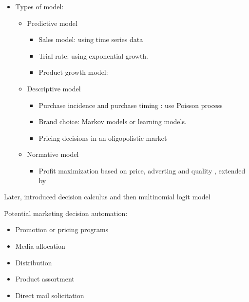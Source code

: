 \documentclass[
]{book}
\providecommand{\tightlist}{%
  \setlength{\itemsep}{0pt}\setlength{\parskip}{0pt}}
\begin{document}
\citep{leeflang2000}

\begin{itemize}
\item
  Types of model:

  \begin{itemize}
  \item
    Predictive model

    \begin{itemize}
    \item
      Sales model: using time series data
    \item
      Trial rate: using exponential growth.
    \item
      Product growth model: \citet{Bass_1969}
    \end{itemize}
  \item
    Descriptive model

    \begin{itemize}
    \item
      Purchase incidence and purchase timing : use Poisson process
    \item
      Brand choice: Markov models or learning models.
    \item
      Pricing decisions in an oligopolistic market \citet{howard1968}
    \end{itemize}
  \item
    Normative model

    \begin{itemize}
    \tightlist
    \item
      Profit maximization based on price, adverting and quality \citep{dorfman1976}, extended by \citep{roberts1964, lambin1970a}
    \end{itemize}
  \end{itemize}
\end{itemize}

Later, \citet{Little_1970} introduced decision calculus and then multinomial logit model \citep{guadagni1983}

Potential marketing decision automation:

\begin{itemize}
\item
  Promotion or pricing programs
\item
  Media allocation
\item
  Distribution
\item
  Product assortment
\item
  Direct mail solicitation
\end{itemize}
\end{document}

